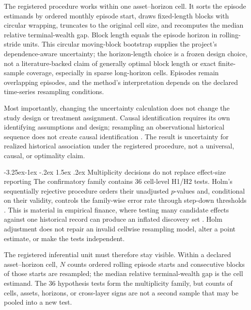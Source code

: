 \documentclass[12pt,a4paper,oneside]{report}
\makeatletter
\renewcommand\subsection{\@startsection{subsection}{2}{\z@}%
  {-3.25ex\@plus -1ex \@minus -.2ex}%
  {1.5ex \@plus .2ex}%
  {\normalfont\fontsize{12}{15}\selectfont\bfseries}}
\makeatother
\begin{document}
The registered procedure works within one asset--horizon cell. It sorts the
episode estimands by ordered monthly episode start, draws fixed-length blocks
with circular wrapping, truncates to the original cell size, and recomputes the
median relative terminal-wealth gap. Block length equals the episode horizon in
rolling-stride units. This circular moving-block bootstrap supplies the
project's dependence-aware uncertainty; the horizon-length choice is a frozen
design choice, not a literature-backed claim of generally optimal block
length or exact finite-sample coverage, especially in sparse long-horizon
cells. Episodes remain overlapping episodes, and the method's interpretation
depends on the declared time-series resampling conditions.

Most importantly, changing the uncertainty calculation does not change the
study design or treatment assignment. Causal identification requires its own
identifying assumptions and design; resampling an observational historical
sequence does not create causal identification \citep{hernanrobins2020}. The
result is uncertainty for realized historical association under the registered
procedure, not a universal, causal, or optimality claim.

\subsection{Multiplicity decisions do not replace effect-size reporting}
\label{sec:lit-method-multiplicity-reporting}
The confirmatory family contains 36 cell-level H1/H2 tests. Holm's sequentially
rejective procedure orders their unadjusted $p$-values and, conditional on
their validity, controls the family-wise error rate through step-down thresholds
\citep{holm1979}. This is material in empirical finance, where testing many
candidate effects against one historical record can produce an inflated
discovery set \citep{harveyliuzhu2016}. Holm adjustment does not repair an
invalid cellwise resampling model, alter a point estimate, or make the tests
independent.

The registered inferential unit must therefore stay visible. Within a declared
asset--horizon cell, $N$ counts ordered rolling episode starts and consecutive
blocks of those starts are resampled; the median relative terminal-wealth gap
is the cell estimand. The 36 hypothesis tests form the multiplicity family, but
counts of cells, assets, horizons, or cross-layer signs are not a second sample
that may be pooled into a new test.
\end{document}
